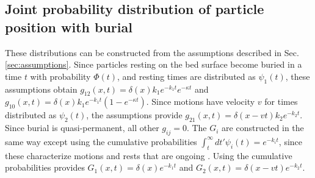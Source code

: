 \subsection{Joint probability distribution of particle position with burial}
\label{sec:solution}

These distributions can be constructed from the assumptions described in Sec. \ref{sec:assumptions}.
Since particles resting on the bed surface become buried in a time $t$ with probability $\Phi(t)$, and resting times are distributed as $\psi_1(t)$, these assumptions obtain $g_{12}(x,t) = \delta(x)k_1e^{-k_1t}e^{-\kappa t}$ and $g_{10}(x,t) = \delta(x) k_1 e^{-k_1 t}(1-e^{-\kappa t})$. Since motions have velocity $v$ for times distributed as $\psi_2(t)$, the assumptions provide $g_{21}(x,t) = \delta(x-vt)k_2e^{-k_2 t}$.
Since burial is quasi-permanent, all other $g_{ij} = 0$.
The $G_i$ are constructed in the same way except using the cumulative probabilities $\int_t^\infty dt'\psi_i(t) = e^{-k_i t}$, since these characterize motions and rests that are ongoing \citep{Weiss1994}.
Using the cumulative probabilities provides $G_1(x,t) = \delta(x)e^{-k_1t}$ and $G_2(x,t) = \delta(x-vt)e^{-k_2 t}$.

